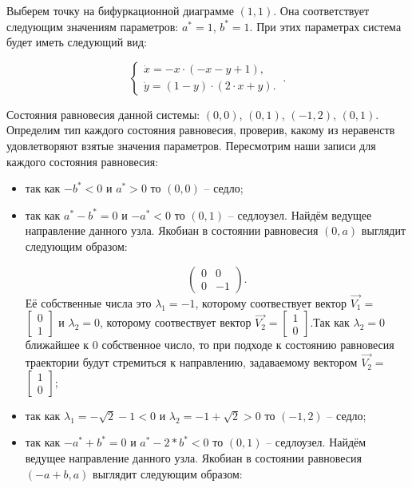 Выберем точку на бифуркационной диаграмме $(1, 1)$. Она соответствует следующим значениям параметров:  $a^\ast = 1$, $b^\ast = 1$. При этих параметрах система будет иметь следующий вид: 

$$
\left \lbrace 
\begin{matrix} 
	\dot{x} = -x \cdot (-x - y + 1), \\
	\dot{y} = (1 - y) \cdot (2 \cdot x + y). \
\end{matrix} 
\right . .$$

Состояния равновесия данной системы: $(0, 0)$, $(0, 1)$, $(-1, 2)$, $(0, 1)$. Определим тип каждого состояния равновесия, проверив, какому из неравенств удовлетворяют взятые значения параметров.  Пересмотрим наши записи для каждого состояния равновесия: 
\begin{itemize}
	\item{ так как $-b^\ast  < 0 $ и $a^\ast > 0 $ то $(0, 0)$ -- седло;}
	\item{ так как $a^\ast - b^\ast = 0 $ и $-a^\ast  < 0 $ то $(0, 1)$ -- седлоузел. Найдём ведущее направление данного узла. Якобиан в состоянии равновесия $(0, a)$ выглядит следующим образом:
		
		$$\begin{pmatrix}0 & 0\\0 & -1\end{pmatrix}. $$Её собственные числа это $\lambda_1=-1$, которому соотвествует вектор $\Vec{V_1}=$ $\left[\begin{matrix}0\\1\end{matrix}\right]$ и $\lambda_2=0$, которому соотвествует вектор $\Vec{V_2}=$$\left[\begin{matrix}1\\0\end{matrix}\right]$.Так как $\lambda_2=0$ ближайшее к $0$ собственное число, то при подходе к состоянию равновесия траектории будут стремиться к направлению, задаваемому вектором $\Vec{V_2}=$ $\left[\begin{matrix}1\\0\end{matrix}\right]$;}
	\item{ так как ${\lambda_{1}} = - \sqrt{2} - 1$$  < 0 $ и ${\lambda_{2}} = -1 + \sqrt{2}$$ > 0 $ то $(-1, 2)$ -- седло;}
	\item{ так как $-a^\ast + b^\ast = 0 $ и $a^\ast - 2*b^\ast  < 0 $ то $(0, 1)$ -- седлоузел. Найдём ведущее направление данного узла. Якобиан в состоянии равновесия $(-a + b, a)$ выглядит следующим образом:
		
}
\end{itemize}
